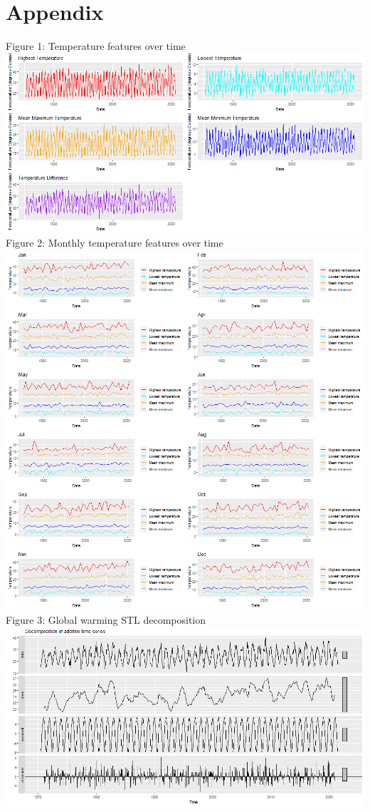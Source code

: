 \documentclass[12pt]{article}
\begin{document}
{\section*{Appendix}
Figure 1: Temperature features over time\\
\includegraphics[scale=0.5]{Overall}\\
\newpage
Figure 2: Monthly temperature features over time\\
\includegraphics[scale=0.5]{Monthly}\\
Figure 3: Global warming STL decomposition\\
\includegraphics[scale=0.5]{GW STL}\\
}
\end{document}
